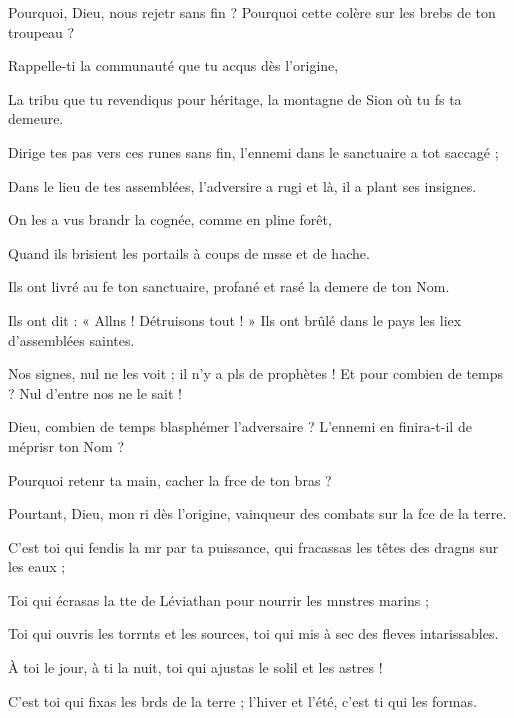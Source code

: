 \item Pourquoi, Dieu, nous rejetr sans fin ? Pourquoi cette colère sur les brebs de ton troupeau ?
\item Rappelle-ti la communauté que tu acqus dès l’origine,
\item La tribu que tu revendiqus pour héritage, la montagne de Sion où tu fs ta demeure.
\item Dirige tes pas vers ces runes sans fin, l’ennemi dans le sanctuaire a tot saccagé ;
\item Dans le lieu de tes assemblées, l’adversire a rugi et là, il a plant ses insignes.
\item On les a vus brandr la cognée, comme en pline forêt,
\item Quand ils brisient les portails à coups de msse et de hache.
\item Ils ont livré au fe ton sanctuaire, profané et rasé la demere de ton Nom.
\item Ils ont dit : « Allns ! Détruisons tout ! » Ils ont brûlé dans le pays les liex d’assemblées saintes.
\item Nos signes, nul ne les voit ; il n’y a pls de prophètes ! Et pour combien de temps ? Nul d’entre nos ne le sait !
\item Dieu, combien de temps blasphémer l’adversaire ? L’ennemi en finira-t-il de méprisr ton Nom ?
\item Pourquoi retenr ta main, cacher la frce de ton bras ?
\item Pourtant, Dieu, mon ri dès l’origine, vainqueur des combats sur la fce de la terre.
\item C’est toi qui fendis la mr par ta puissance, qui fracassas les têtes des dragns sur les eaux ;
\item Toi qui écrasas la tte de Léviathan pour nourrir les mnstres marins ;
\item Toi qui ouvris les torrnts et les sources, toi qui mis à sec des fleves intarissables.
\item À toi le jour, à ti la nuit, toi qui ajustas le solil et les astres !
\item C’est toi qui fixas les brds de la terre ; l’hiver et l’été, c’est ti qui les formas.
